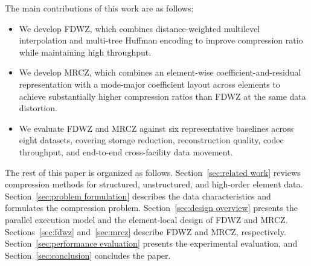 The main contributions of this work are as follows:
\begin{itemize}
\item We develop FDWZ, which combines distance-weighted multilevel interpolation and multi-tree Huffman encoding to improve compression ratio while maintaining high throughput.
\item We develop MRCZ, which combines an element-wise coefficient-and-residual representation with a mode-major coefficient layout across elements to achieve substantially higher compression ratios than FDWZ at the same data distortion.
\item We evaluate FDWZ and MRCZ against six representative baselines across eight datasets, covering storage reduction, reconstruction quality, codec throughput, and end-to-end cross-facility data movement.
\end{itemize}

The rest of this paper is organized as follows. Section~\ref{sec:related work} reviews compression methods for structured, unstructured, and high-order element data. Section~\ref{sec:problem formulation} describes the data characteristics and formulates the compression problem. Section~\ref{sec:design overview} presents the parallel execution model and the element-local design of FDWZ and MRCZ. Sections~\ref{sec:fdwz} and~\ref{sec:mrcz} describe FDWZ and MRCZ, respectively. Section~\ref{sec:performance evaluation} presents the experimental evaluation, and Section~\ref{sec:conclusion} concludes the paper.

